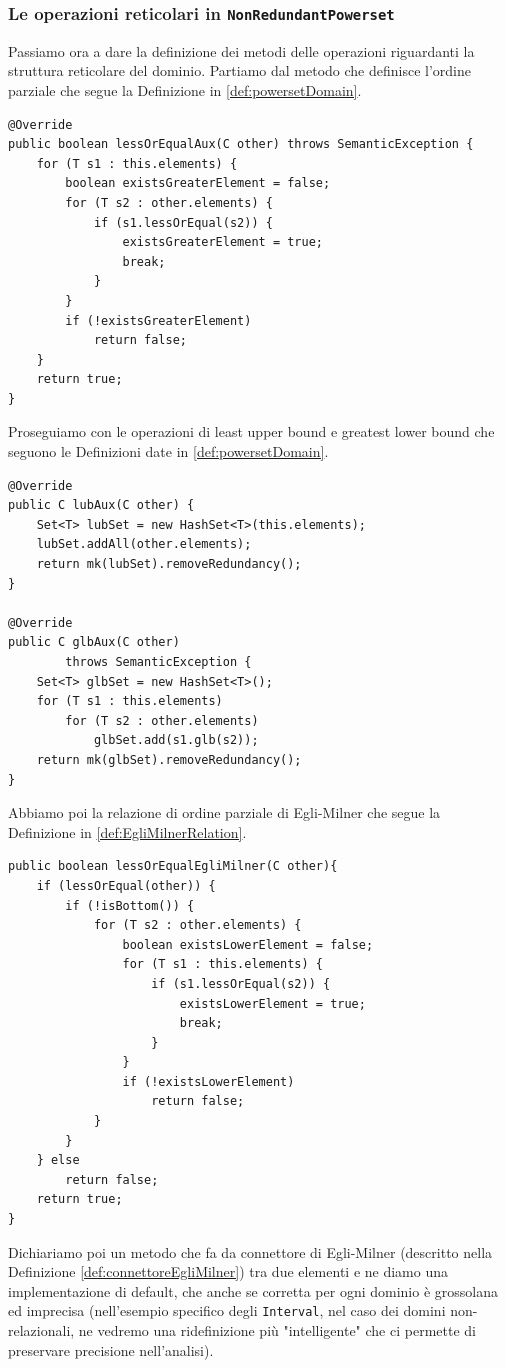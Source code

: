 \subsubsection{Le operazioni reticolari in \texttt{NonRedundantPowerset}}
Passiamo ora a dare la definizione dei metodi delle operazioni riguardanti la struttura reticolare del dominio. Partiamo dal metodo che definisce l'ordine parziale che segue la Definizione in \ref{def:powersetDomain}.
\begin{lstlisting}[belowskip=-1.1 \baselineskip]
@Override
public boolean lessOrEqualAux(C other) throws SemanticException {
    for (T s1 : this.elements) {
        boolean existsGreaterElement = false;
        for (T s2 : other.elements) {
            if (s1.lessOrEqual(s2)) {
                existsGreaterElement = true;
                break;
            }
        }
        if (!existsGreaterElement)
            return false;
    }
    return true;
}
\end{lstlisting}
Proseguiamo con le operazioni di least upper bound e greatest lower bound che seguono le Definizioni date in \ref{def:powersetDomain}.
\begin{lstlisting}[belowskip=-1.1 \baselineskip]
@Override
public C lubAux(C other) {
    Set<T> lubSet = new HashSet<T>(this.elements);
    lubSet.addAll(other.elements);
    return mk(lubSet).removeRedundancy();
}

@Override
public C glbAux(C other)
        throws SemanticException {
    Set<T> glbSet = new HashSet<T>();
    for (T s1 : this.elements)
        for (T s2 : other.elements)
            glbSet.add(s1.glb(s2));
    return mk(glbSet).removeRedundancy();
}
\end{lstlisting}
Abbiamo poi la relazione di ordine parziale di Egli-Milner che segue la Definizione in \ref{def:EgliMilnerRelation}.
\begin{lstlisting}[belowskip=-1.1 \baselineskip]
public boolean lessOrEqualEgliMilner(C other){
    if (lessOrEqual(other)) {
        if (!isBottom()) {
            for (T s2 : other.elements) {
                boolean existsLowerElement = false;
                for (T s1 : this.elements) {
                    if (s1.lessOrEqual(s2)) {
                        existsLowerElement = true;
                        break;
                    }
                }
                if (!existsLowerElement)
                    return false;
            }
        }
    } else
        return false;
    return true;
}
\end{lstlisting}
Dichiariamo poi un metodo che fa da connettore di Egli-Milner (descritto nella Definizione \ref{def:connettoreEgliMilner}) tra due elementi e ne diamo una implementazione di default, che anche se corretta per ogni dominio è grossolana ed imprecisa (nell'esempio specifico degli \texttt{Interval}, nel caso dei domini non-relazionali, ne vedremo una ridefinizione più "intelligente" che ci permette di preservare precisione nell'analisi).
